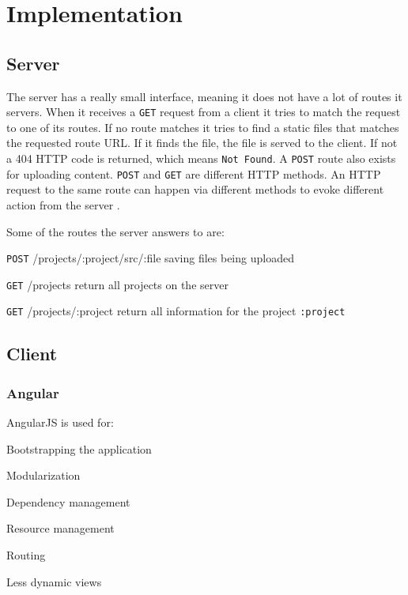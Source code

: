 
\section{Implementation}
\label{implementation}


\subsection{Server}

The server has a really small interface, meaning it does not have a lot of routes it servers.
When it receives a \texttt{GET} request from a client it tries to match the request to one of its routes.
If no route matches it tries to find a static files that matches the requested route URL.
If it finds the file, the file is served to the client.
If not a 404 HTTP code is returned, which means \texttt{Not Found}.
A \texttt{POST} route also exists for uploading content.
\texttt{POST} and \texttt{GET} are different HTTP methods.
An HTTP request to the same route can happen via different methods to evoke different action from the server \cite{httpmethods}.

Some of the routes the server answers to are:

\begin{description*}
  \item[\texttt{POST} /projects/:project/src/:file]
    saving files being uploaded
  \item[\texttt{GET} /projects]
    return all projects on the server
  \item[\texttt{GET} /projects/:project]
    return all information for the project \texttt{:project}
\end{description*}

\subsection{Client}


\subsubsection{Angular}
\label{angular}

AngularJS is used for:

\begin{itemize*}
  \item Bootstrapping the application
  \item Modularization
  \item Dependency management
  \item Resource management
  \item Routing
  \item Less dynamic views
\end{itemize*}

